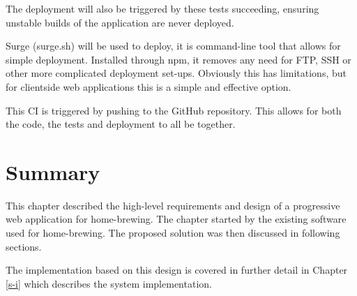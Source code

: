 The deployment will also be triggered by these tests succeeding, ensuring unstable builds of the application are never deployed.

Surge (surge.sh) will be used to deploy, it is command-line tool that allows for simple deployment. Installed through npm, it removes any need for FTP, SSH or other more complicated deployment set-ups. Obviously this has limitations, but for clientside web applications this is a simple and effective option. \cite{surge}

This CI is triggered by pushing to the GitHub repository. This allows for both the code, the tests and deployment to all be together.

\section{Summary} \label{a-d--summary}

This chapter described the high-level requirements and design of a progressive web application for home-brewing. The chapter started by the existing software used for home-brewing. The proposed solution was then discussed in following sections.

The implementation based on this design is covered in further detail in Chapter \ref{s-i} which describes the system implementation.
